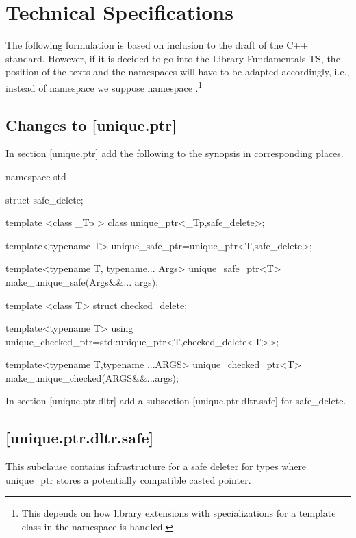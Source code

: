 \documentclass[ebook,11pt,article]{memoir}
\begin{document}
\chapter{Technical Specifications}
The following formulation is based on inclusion to the draft of the C++ standard. However, if it is decided to go into the Library Fundamentals TS, the position of the texts and the namespaces will have to be adapted accordingly, i.e., instead of namespace  we suppose namespace .\footnote{This depends on how library extensions with specializations for a template class in the  namespace is handled.}

\section{Changes to [unique.ptr] }
In section [unique.ptr] add the following to the  synopsis in corresponding places.

\begin{codeblock}
namespace std{

struct safe_delete;

template <class _Tp >
class unique_ptr<_Tp,safe_delete>;

template<typename T>
unique_safe_ptr=unique_ptr<T,safe_delete>;

template<typename T, typename... Args>
unique_safe_ptr<T> make_unique_safe(Args&&... args);

template <class T>
struct  checked_delete;

template<typename T>
using unique_checked_ptr=std::unique_ptr<T,checked_delete<T>>;

template<typename T,typename ...ARGS>
unique_checked_ptr<T> make_unique_checked(ARGS&&...args);

}
\end{codeblock}

In section [unique.ptr.dltr] add a subsection [unique.ptr.dltr.safe] for safe_delete.

\section{ [unique.ptr.dltr.safe]}
\pnum
This subclause contains infrastructure for a safe deleter for types where unique_ptr stores a potentially compatible casted pointer.%
\end{document}
